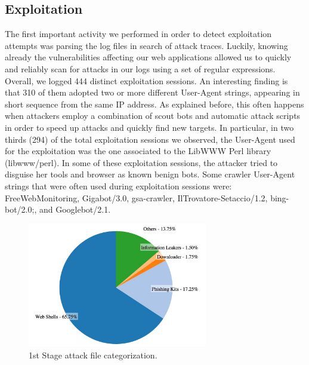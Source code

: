 \subsection{Exploitation}

The first important activity we performed in order to detect exploitation attempts was parsing the log files in search of attack traces. Luckily, knowing already the vulnerabilities affecting our web applications allowed us to quickly and reliably scan for attacks in our logs using a set of regular expressions.
Overall, we logged 444 distinct exploitation sessions. An interesting finding is that 310 of them adopted two or more different User-Agent strings, appearing in short sequence from the same IP address. As explained before, this often happens when attackers employ a combination of scout bots and automatic attack scripts in order to speed up attacks and quickly find new targets. In particular, in two thirds (294) of the total exploitation sessions we observed, the User-Agent used for the exploitation was the one associated to the LibWWW Perl library (libwww/perl).
In some of these exploitation sessions, the attacker tried to disguise her tools and browser as known benign bots. Some crawler User-Agent strings that were often used during exploitation sessions were: FreeWebMonitoring, Gigabot/3.0, gsa-crawler, IlTrovatore-Setaccio/1.2, bing- bot/2.0;, and Googlebot/2.1.

\begin{figure}[tbh]
\centerline{\includegraphics[width=0.7\textwidth]{Images/1stStageAttack.jpg}}
\caption{1st Stage attack file categorization.\label{fig:1stStageAttack}}
\end{figure}

